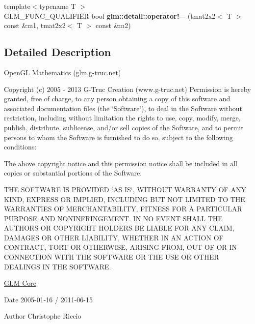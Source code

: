 \begin{DoxyCompactItemize}
\item 
\hypertarget{namespaceglm_1_1detail_afaa47f0fdaa00c1707b046975bf24407}{}{\footnotesize template$<$typename T $>$ }\\G\+L\+M\+\_\+\+F\+U\+N\+C\+\_\+\+Q\+U\+A\+L\+I\+F\+I\+E\+R bool {\bfseries glm\+::detail\+::operator!=} (tmat2x2$<$ T $>$ const \&m1, tmat2x2$<$ T $>$ const \&m2)\label{namespaceglm_1_1detail_afaa47f0fdaa00c1707b046975bf24407}

\end{DoxyCompactItemize}


\subsection{Detailed Description}
Open\+G\+L Mathematics (glm.\+g-\/truc.\+net)

Copyright (c) 2005 -\/ 2013 G-\/\+Truc Creation (www.\+g-\/truc.\+net) Permission is hereby granted, free of charge, to any person obtaining a copy of this software and associated documentation files (the \char`\"{}\+Software\char`\"{}), to deal in the Software without restriction, including without limitation the rights to use, copy, modify, merge, publish, distribute, sublicense, and/or sell copies of the Software, and to permit persons to whom the Software is furnished to do so, subject to the following conditions\+:

The above copyright notice and this permission notice shall be included in all copies or substantial portions of the Software.

T\+H\+E S\+O\+F\+T\+W\+A\+R\+E I\+S P\+R\+O\+V\+I\+D\+E\+D \char`\"{}\+A\+S I\+S\char`\"{}, W\+I\+T\+H\+O\+U\+T W\+A\+R\+R\+A\+N\+T\+Y O\+F A\+N\+Y K\+I\+N\+D, E\+X\+P\+R\+E\+S\+S O\+R I\+M\+P\+L\+I\+E\+D, I\+N\+C\+L\+U\+D\+I\+N\+G B\+U\+T N\+O\+T L\+I\+M\+I\+T\+E\+D T\+O T\+H\+E W\+A\+R\+R\+A\+N\+T\+I\+E\+S O\+F M\+E\+R\+C\+H\+A\+N\+T\+A\+B\+I\+L\+I\+T\+Y, F\+I\+T\+N\+E\+S\+S F\+O\+R A P\+A\+R\+T\+I\+C\+U\+L\+A\+R P\+U\+R\+P\+O\+S\+E A\+N\+D N\+O\+N\+I\+N\+F\+R\+I\+N\+G\+E\+M\+E\+N\+T. I\+N N\+O E\+V\+E\+N\+T S\+H\+A\+L\+L T\+H\+E A\+U\+T\+H\+O\+R\+S O\+R C\+O\+P\+Y\+R\+I\+G\+H\+T H\+O\+L\+D\+E\+R\+S B\+E L\+I\+A\+B\+L\+E F\+O\+R A\+N\+Y C\+L\+A\+I\+M, D\+A\+M\+A\+G\+E\+S O\+R O\+T\+H\+E\+R L\+I\+A\+B\+I\+L\+I\+T\+Y, W\+H\+E\+T\+H\+E\+R I\+N A\+N A\+C\+T\+I\+O\+N O\+F C\+O\+N\+T\+R\+A\+C\+T, T\+O\+R\+T O\+R O\+T\+H\+E\+R\+W\+I\+S\+E, A\+R\+I\+S\+I\+N\+G F\+R\+O\+M, O\+U\+T O\+F O\+R I\+N C\+O\+N\+N\+E\+C\+T\+I\+O\+N W\+I\+T\+H T\+H\+E S\+O\+F\+T\+W\+A\+R\+E O\+R T\+H\+E U\+S\+E O\+R O\+T\+H\+E\+R D\+E\+A\+L\+I\+N\+G\+S I\+N T\+H\+E S\+O\+F\+T\+W\+A\+R\+E.

\hyperlink{group__core}{G\+L\+M Core}

\begin{DoxyDate}{Date}
2005-\/01-\/16 / 2011-\/06-\/15 
\end{DoxyDate}
\begin{DoxyAuthor}{Author}
Christophe Riccio 
\end{DoxyAuthor}
